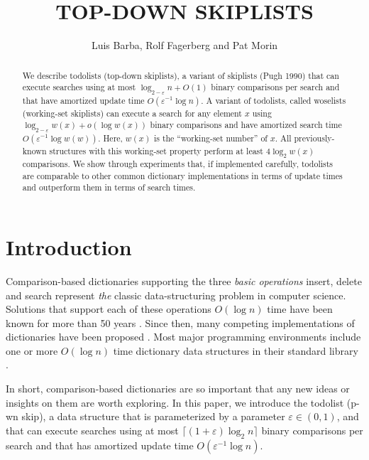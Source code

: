 \documentclass[lotsofwhite]{patmorin}
\title{\MakeUppercase{Top-Down Skiplists}}
\author{Luis Barba, Rolf Fagerberg and Pat Morin}
\newcommand{\eps}{\varepsilon}
\begin{document}
\begin{titlepage}
\maketitle

\begin{abstract}
  We describe todolists (top-down skiplists), a variant of skiplists (Pugh
  1990) that can execute searches using at most $\log_{2-\eps}
  n + O(1)$ binary comparisons per search and that have amortized update
  time $O(\eps^{-1}\log n)$.  A variant of todolists, called woselists
  (working-set skiplists) can execute a search for any element $x$ using
  $\log_{2-\eps} w(x) + o(\log w(x))$ binary comparisons and have amortized
  search time $O(\eps^{-1}\log w(w))$.  Here, $w(x)$ is
  the ``working-set number'' of $x$.  All previously-known structures with
  this working-set property perform at least $4\log_2 w(x)$ comparisons.
  We show through experiments that, if implemented carefully, todolists
  are comparable to other common dictionary implementations in terms of
  update times and outperform them in terms of search times.
\end{abstract}

\end{titlepage}

\section{Introduction}

Comparison-based dictionaries supporting the three \emph{basic operations}
insert, delete and search represent \emph{the} classic data-structuring
problem in computer science.  Solutions that support each of these
operations $O(\log n)$ time have been known for more than 50 years
\cite{avl}.  Since then, many competing implementations of dictionaries
have been proposed \cite{X}.  Most major programming environments include
one or more $O(\log n)$ time dictionary data structures in their standard
library \cite{S}.

In short, comparison-based dictionaries are so important that any
new ideas or insights on them are worth exploring.  In this paper,
we introduce the todolist (p-wn skip), a
data structure that is parameterized by a parameter $\eps\in(0,1)$,
and that can execute searches using at most $\lceil(1+\eps)\log_2
n\rceil$ binary comparisons per search and that has amortized update
time $O(\eps^{-1}\log n)$.
\end{document}

